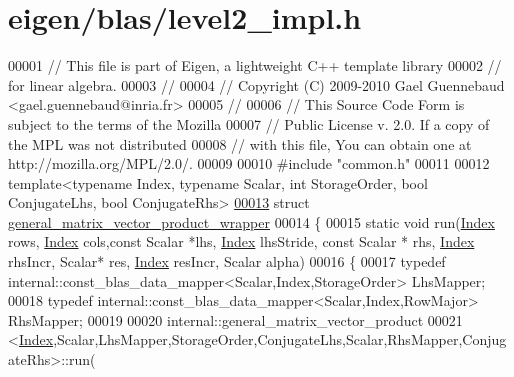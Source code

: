 \hypertarget{eigen_2blas_2level2__impl_8h_source}{}\section{eigen/blas/level2\+\_\+impl.h}
\label{eigen_2blas_2level2__impl_8h_source}

\begin{DoxyCode}
00001 \textcolor{comment}{// This file is part of Eigen, a lightweight C++ template library}
00002 \textcolor{comment}{// for linear algebra.}
00003 \textcolor{comment}{//}
00004 \textcolor{comment}{// Copyright (C) 2009-2010 Gael Guennebaud <gael.guennebaud@inria.fr>}
00005 \textcolor{comment}{//}
00006 \textcolor{comment}{// This Source Code Form is subject to the terms of the Mozilla}
00007 \textcolor{comment}{// Public License v. 2.0. If a copy of the MPL was not distributed}
00008 \textcolor{comment}{// with this file, You can obtain one at http://mozilla.org/MPL/2.0/.}
00009 
00010 \textcolor{preprocessor}{#include "common.h"}
00011 
00012 \textcolor{keyword}{template}<\textcolor{keyword}{typename} Index, \textcolor{keyword}{typename} Scalar, \textcolor{keywordtype}{int} StorageOrder, \textcolor{keywordtype}{bool} ConjugateLhs, \textcolor{keywordtype}{bool} ConjugateRhs>
\hyperlink{structgeneral__matrix__vector__product__wrapper}{00013} \textcolor{keyword}{struct }\hyperlink{structgeneral__matrix__vector__product__wrapper}{general\_matrix\_vector\_product\_wrapper}
00014 \{
00015   \textcolor{keyword}{static} \textcolor{keywordtype}{void} run(\hyperlink{namespace_eigen_a62e77e0933482dafde8fe197d9a2cfde}{Index} rows, \hyperlink{namespace_eigen_a62e77e0933482dafde8fe197d9a2cfde}{Index} cols,\textcolor{keyword}{const} Scalar *lhs, \hyperlink{namespace_eigen_a62e77e0933482dafde8fe197d9a2cfde}{Index} lhsStride, \textcolor{keyword}{const} Scalar *
      rhs, \hyperlink{namespace_eigen_a62e77e0933482dafde8fe197d9a2cfde}{Index} rhsIncr, Scalar* res, \hyperlink{namespace_eigen_a62e77e0933482dafde8fe197d9a2cfde}{Index} resIncr, Scalar alpha)
00016   \{
00017     \textcolor{keyword}{typedef} internal::const\_blas\_data\_mapper<Scalar,Index,StorageOrder> LhsMapper;
00018     \textcolor{keyword}{typedef} internal::const\_blas\_data\_mapper<Scalar,Index,RowMajor> RhsMapper;
00019     
00020     internal::general\_matrix\_vector\_product
00021         <\hyperlink{namespace_eigen_a62e77e0933482dafde8fe197d9a2cfde}{Index},Scalar,LhsMapper,StorageOrder,ConjugateLhs,Scalar,RhsMapper,ConjugateRhs>::run(

\end{DoxyCode}
